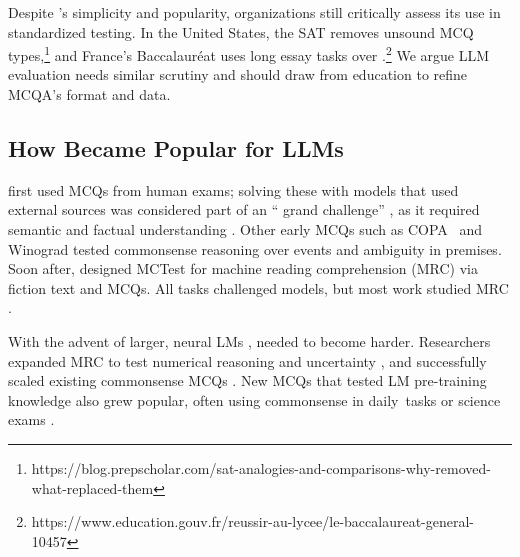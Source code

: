 Despite \mcqa's simplicity and popularity, organizations still
critically assess its use in standardized testing.  In the United
States, the SAT removes unsound MCQ
types,\footnote{https://blog.prepscholar.com/sat-analogies-and-comparisons-why-removed-what-replaced-them} and France's
Baccalauréat uses long essay tasks over
\mcqa.\footnote{https://www.education.gouv.fr/reussir-au-lycee/le-baccalaureat-general-10457} We argue
LLM evaluation needs similar scrutiny and should draw from education to
refine MCQA's format and data.



\subsection{How \mcqa Became Popular for LLMs} \label{subsection:eval_machines}

 first used MCQs from human exams; solving these with models that used external sources was considered part of an `` grand challenge'' \cite{reddy1988foundations}, as it required semantic \cite{turney2003combining, veale2004wordnet} and factual understanding \cite{6587172, 10.1145/2509558.2509565}.
Other early MCQs such as COPA~\cite{roemmele2011choice} and Winograd \cite{levesque2012winograd} tested commonsense reasoning over events and ambiguity in premises.
Soon after, \citet{richardson2013mctest} designed MCTest for machine reading comprehension (MRC) via fiction text and MCQs.
All tasks challenged models, but most \mcqa work studied MRC \cite{lai-etal-2017-race}.

With the advent of larger, neural LMs \cite{devlin2018bert}, \mcqa needed to become harder.
Researchers expanded MRC to test numerical reasoning \cite{dua2019drop} and uncertainty \cite{rogers2020getting}, and successfully scaled existing commonsense MCQs \cite{sakaguchi2021winogrande}.
New MCQs that tested LM pre-training knowledge also grew popular, often using commonsense in daily~tasks \cite{talmor2018commonsenseqa, bisk2020piqa} or science exams \cite{mihaylov2018can, clark2018think}.

